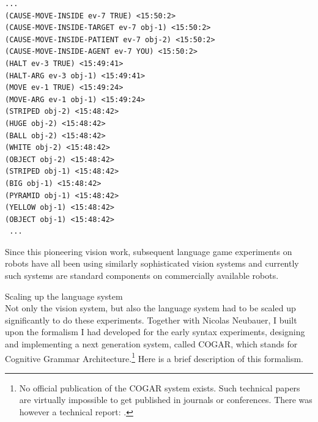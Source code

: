 \begin{verbatim}
... 
(CAUSE-MOVE-INSIDE ev-7 TRUE) <15:50:2>
(CAUSE-MOVE-INSIDE-TARGET ev-7 obj-1) <15:50:2>
(CAUSE-MOVE-INSIDE-PATIENT ev-7 obj-2) <15:50:2>
(CAUSE-MOVE-INSIDE-AGENT ev-7 YOU) <15:50:2>
(HALT ev-3 TRUE) <15:49:41>
(HALT-ARG ev-3 obj-1) <15:49:41>
(MOVE ev-1 TRUE) <15:49:24>
(MOVE-ARG ev-1 obj-1) <15:49:24>
(STRIPED obj-2) <15:48:42>
(HUGE obj-2) <15:48:42>
(BALL obj-2) <15:48:42>
(WHITE obj-2) <15:48:42>
(OBJECT obj-2) <15:48:42>
(STRIPED obj-1) <15:48:42>
(BIG obj-1) <15:48:42>
(PYRAMID obj-1) <15:48:42>
(YELLOW obj-1) <15:48:42>
(OBJECT obj-1) <15:48:42>
 ...
\end{verbatim}

Since this pioneering vision work, subsequent language game experiments on robots have all been using 
similarly sophisticated vision systems and currently such systems are standard components on commercially available
robots. 

{\bfshape  Scaling up the language system}\\

Not only the vision system, but also the language system had to be scaled up significantly to do these experiments. 
Together with Nicolas Neubauer, I built upon the formalism I had developed for the early syntax experiments, 
designing and implementing a next generation system, called COGAR,  which stands for 
Cognitive Grammar Architecture.\footnote{
No official publication of the COGAR system exists. Such technical papers are virtually impossible to get 
published in journals or conferences. There was however a technical report: \cite{Steels:2001}.}
Here is a brief description of this formalism. 

